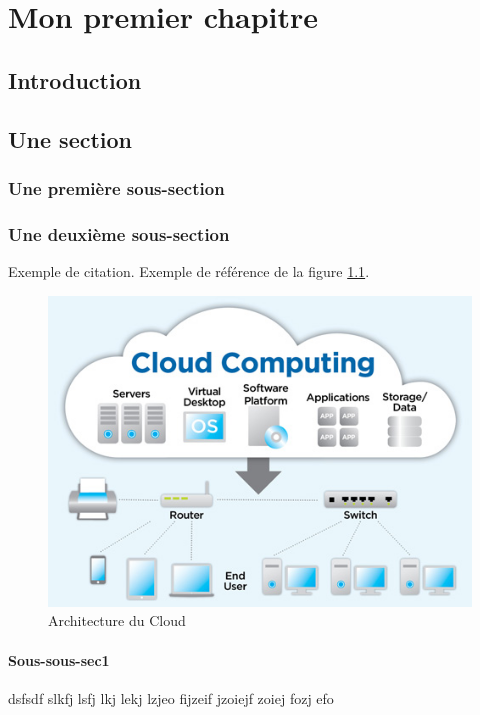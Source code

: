 \chapter{Mon premier chapitre}
\section{Introduction}
\lipsum[1-1]%
\section{Une section}

\subsection{Une première sous-section}
\lipsum[1-1]%
\subsection{Une deuxième sous-section}

Exemple de citation\cite{deffog}. Exemple de référence de la figure \ref{cloud}.
\begin{figure}[H]
	\centering
	\includegraphics[scale=0.6]{figures/cloud-public.jpg}
	\caption{Architecture du Cloud}
	\label{cloud}
\end{figure}

\subsubsection{Sous-sous-sec1}
dsfsdf slkfj lsfj lkj lekj lzjeo fijzeif jzoiejf zoiej fozj efo
